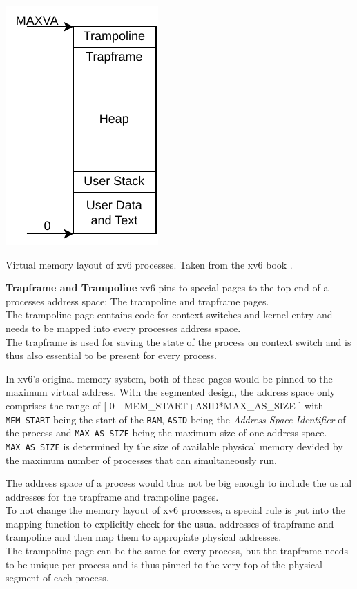 \begin{marginfigure}
    \centering
    \includegraphics[scale=.8]{figures/prog_vm.pdf}
    \caption[xv6 memory layout]{Virtual memory layout of xv6 processes. Taken from the xv6 book \cite{cox2011xv6}.}
    \label{impl:proclayout}
\end{marginfigure}


\textbf{Trapframe and Trampoline} xv6 pins to special pages to the top end of a processes address space: The trampoline and trapframe pages.\\
The trampoline page contains code for context switches and kernel entry and needs to be mapped
into every processes address space.\\
The trapframe is used for saving the state of the process on context switch and is thus also essential to be present for every process.

In xv6's original memory system, both of these pages would be pinned to the maximum virtual address.
With the segmented design, the address space only comprises the range of [
    0 - MEM\_START+ASID*MAX\_AS\_SIZE
]
with \texttt{MEM\_START} being the start of the \texttt{RAM}, \texttt{ASID} being the \emph{Address Space Identifier} of the process and \texttt{MAX\_AS\_SIZE} being the maximum size of one address space.\\
\texttt{MAX\_AS\_SIZE} is determined by the size of available physical memory devided by the maximum
number of processes that can simultaneously run.

The address space of a process would thus not be big enough to include the usual addresses for the
trapframe and trampoline pages.\\
To not change the memory layout of xv6 processes, a special rule is put into the mapping function
to explicitly check for the usual addresses of trapframe and trampoline and then map them to appropiate physical addresses.\\
The trampoline page can be the same for every process, but the trapframe needs to be unique per
process and is thus pinned to the very top of the physical segment of each process.


